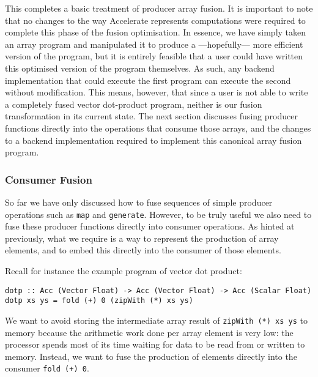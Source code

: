 This completes a basic treatment of producer array fusion. It is important to
note that no changes to the way Accelerate represents computations were required
to complete this phase of the fusion optimisation. In essence, we have simply
taken an array program and manipulated it to produce a ---hopefully--- more
efficient version of the program, but it is entirely feasible that a user could
have written this optimised version of the program themselves. As such, any
backend implementation that could execute the first program can execute the
second without modification.
%
This means, however, that since a user is not able to write a completely fused
vector dot-product program, neither is our fusion transformation in its current
state. The next section discusses fusing producer functions directly into the
operations that consume those arrays, and the changes to a backend
implementation required to implement this canonical array fusion program.


\subsubsection{Consumer Fusion}

So far we have only discussed how to fuse sequences of simple producer
operations such as \texttt{map} and \texttt{generate}. However, to be truly
useful we also need to fuse these producer functions directly into consumer
operations. As hinted at previously, what we require is a way to represent the
production of array elements, and to embed this directly into the consumer of
those elements. %

Recall for instance the example program of vector dot product:
%
\begin{lstlisting}[style=haskell]
dotp :: Acc (Vector Float) -> Acc (Vector Float) -> Acc (Scalar Float)
dotp xs ys = fold (+) 0 (zipWith (*) xs ys)
\end{lstlisting}
%
We want to avoid storing the intermediate array result of
\lstinline[style=inline]{zipWith (*) xs ys} to memory because the arithmetic
work done per array element is very low: the processor spends most of its time
waiting for data to be read from or written to memory. Instead, we want to fuse
the production of elements directly into the consumer
\lstinline[style=inline]{fold (+) 0}.

